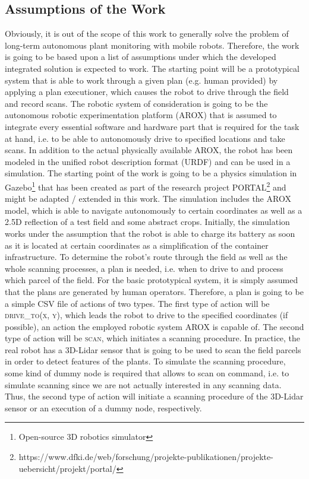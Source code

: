 \documentclass[english, master, expose, utf8]{base/thesis_KBS}
\begin{document}
\subsection{Assumptions of the Work}

Obviously, it is out of the scope of this work to generally solve the problem of long-term autonomous plant monitoring with mobile robots.
Therefore, the work is going to be based upon a list of assumptions under which the developed integrated solution is expected to work.
The starting point will be a prototypical system that is able to work through a given plan (e.g. human provided) by applying a plan executioner,
which causes the robot to drive through the field and record scans.
The robotic system of consideration is going to be the autonomous robotic experimentation platform (AROX) \cite{Kisliuk:2021} that is assumed to integrate every
essential software and hardware part that is required for the task at hand, i.e. to be able to autonomously drive to specified locations and take scans.
In addition to the actual physically available AROX, the robot has been modeled in the unified robot description format (URDF) and can be used in a simulation.
The starting point of the work is going to be a physics simulation in Gazebo\footnote{Open-source 3D robotics simulator} that has been created as part of the research project 
PORTAL\footnote{https://www.dfki.de/web/forschung/projekte-publikationen/projekte-uebersicht/projekt/portal/} and might be adapted / extended in this work.
The simulation includes the AROX model, which is able to navigate autonomously to certain coordinates as well as a 2.5D  reflection of a test field and some abstract crops.
Initially, the simulation works under the assumption that the robot is able to charge its battery as soon as it is located at certain coordinates as a simplification
of the container infrastructure.\newline
To determine the robot's route through the field as well as the whole scanning processes, a plan is needed, i.e. when to drive to and process which parcel of the field. 
For the basic prototypical system, it is simply assumed that the plans are generated by human operators. Therefore, a plan is going to be a simple CSV file of actions of two types.
The first type of action will be \textsc{drive\_to(x, y)}, which leads the robot to drive to the specified coordinates (if possible), an action the employed robotic system 
AROX is capable of. The second type of action will be \textsc{scan}, which initiates a scanning procedure. In practice, the real robot has a 3D-Lidar sensor that is going 
to be used to scan the field parcels in order to detect features of the plants. To simulate the scanning procedure, some kind of dummy node is required that allows to 
scan on command, i.e. to simulate scanning since we are not actually interested in any scanning data. Thus, the second type of action will initiate a scanning procedure of
the 3D-Lidar sensor or an execution of a dummy node, respectively.
\end{document}
